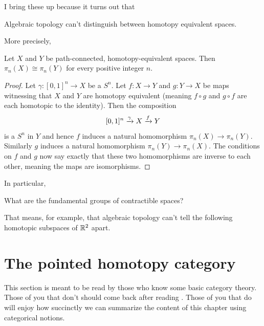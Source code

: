 I bring these up because it turns out that
\begin{moral}
	Algebraic topology can't distinguish between homotopy equivalent spaces.
\end{moral}
More precisely,
\begin{theorem}
	\label{thm:fundgrp_homotopy_invariant}
	Let $X$ and $Y$ be path-connected, homotopy-equivalent spaces.
	Then $\pi_n(X) \cong \pi_n(Y)$ for every positive integer $n$.
\end{theorem}
\begin{proof}
	Let $\gamma \colon [0,1]^n \to X$ be a $S^n$.
	Let $f \colon X \to Y$ and $g \colon Y \to X$ be maps witnessing that $X$ and $Y$ are homotopy equivalent
	(meaning $f \circ g$ and $g \circ f$ are each homotopic to the identity).
	Then the composition
	\[ [0,1]^n \xrightarrow{\gamma} X \xrightarrow{f} Y \]
	is a $S^n$ in $Y$ and hence $f$ induces a natural homomorphism $\pi_n(X) \to \pi_n(Y)$.
	Similarly $g$ induces a natural homomorphism $\pi_n(Y) \to \pi_n(X)$.
	The conditions on $f$ and $g$ now say exactly that these two homomorphisms
	are inverse to each other, meaning the maps are isomorphisms.
\end{proof}
In particular,
\begin{ques}
	What are the fundamental groups of contractible spaces?
\end{ques}

That means, for example, that algebraic topology can't tell
the following homotopic subspaces of $\mathbb R^2$ apart.
\begin{center}
	{\color{red} \Huge \venus}
	\qquad
	{\color{blue} \Huge \mars}
\end{center}

\section{The pointed homotopy category}
This section is meant to be read by those who know some basic category theory.
Those of you that don't should come back after reading .
Those of you that do will enjoy how succinctly we can summarize
the content of this chapter using categorical notions.

